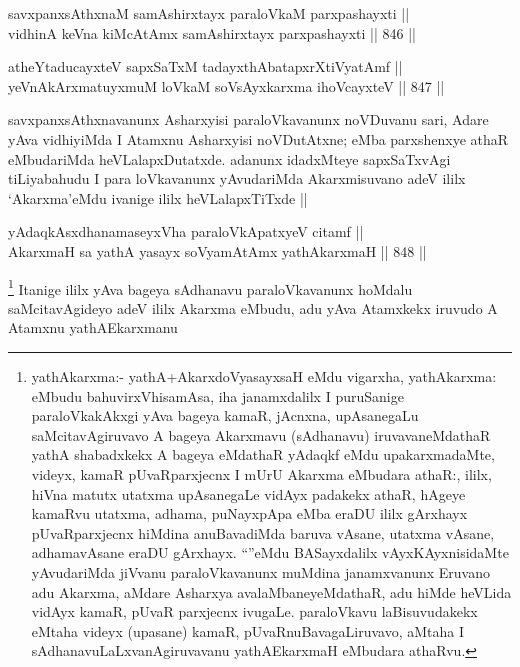 \begin{shl}
savxpanxsAthxnaM samAshirxtayx paraloVkaM parxpashayxti || \\
vidhinA keVna kiMcA\s \s tAmx samAshirxtayx parxpashayxti ||  846 ||  
\end{shl}
				
\begin{shl}
atheYtaducayxteV sapxSaTxM tadayxthAbatapxrXtiVyatAmf || \\
yeVnA\s \s kArxmatuyxmuM loVkaM soV\s sAyx\s \s karxma ihoVcayxteV ||  847 ||  
\end{shl}

\begin{artha}
savxpanxsAthxnavanunx Asharxyisi paraloVkavanunx noVDuvanu sari, Adare yAva vidhiyiMda I Atamxnu Asharxyisi noVDutAtxne; eMba parxshenxye athaR eMbudariMda heVLalapxDutatxde. adanunx idadxMteye sapxSaTxvAgi tiLiyabahudu I para loVkavanunx yAvudariMda Akarxmisuvano adeV ililx `Akarxma'eMdu ivanige ililx heVLalapxTiTxde ||
\end{artha}


\begin{shl}
yAdaqkAsxdhanamaseyxVha paraloVkApatxyeV citamf ||  \\
AkarxmaH sa yathA yasayx soV\s yamAtAmx yathAkarxmaH ||  848 ||  
\end{shl}

\begin{artha}
\footnote{yathA\s karxma:- yathA+AkarxdoVyasayxsaH eMdu vigarxha, yathAkarxma: eMbudu bahuvirxVhisamAsa, iha janamxdalilx I puruSanige paraloVkakAkxgi yAva bageya kamaR, jAcnxna, upAsanegaLu saMcitavAgiruvavo A bageya Akarxmavu (sAdhanavu) iruvavaneMdathaR yathA shabadxkekx A bageya eMdathaR yAdaqkf eMdu upakarxmadaMte, videyx, kamaR pUvaRparxjecnx I mUrU Akarxma eMbudara athaR:, ililx, hiVna matutx utatxma upAsanegaLe vidAyx padakekx athaR, hAgeye kamaRvu utatxma, adhama, puNayxpApa eMba eraDU ililx gArxhayx pUvaRparxjecnx hiMdina anuBavadiMda baruva vAsane, utatxma vAsane, adhamavAsane eraDU gArxhayx. ``\stext''eMdu BASayxdalilx vAyxKAyxnisidaMte yAvudariMda jiVvanu paraloVkavanunx muMdina janamxvanunx Eruvano adu Akarxma, aMdare Asharxya avalaMbaneyeMdathaR, adu hiMde heVLida vidAyx kamaR, pUvaR parxjecnx ivugaLe. paraloVkavu laBisuvudakekx eMtaha videyx (upasane) kamaR, pUvaRnuBavagaLiruvavo, aMtaha I sAdhanavuLaLxvanAgiruvavanu yathAE\s karxmaH eMbudara athaRvu.}
Itanige ililx yAva bageya sAdhanavu paraloVkavanunx hoMdalu saMcitavAgideyo adeV ililx Akarxma eMbudu, adu yAva Atamxkekx iruvudo A Atamxnu yathAE\s karxmanu
\end{artha}

